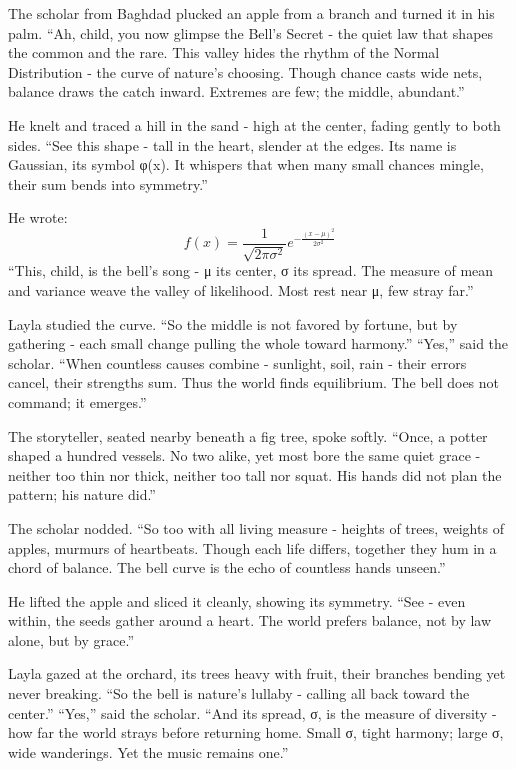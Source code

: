\documentclass[
  letterpaper,
  DIV=11,
  numbers=noendperiod]{scrreprt}
\begin{document}
The scholar from Baghdad plucked an apple from a branch and turned it in
his palm. ``Ah, child, you now glimpse the Bell's Secret - the quiet law
that shapes the common and the rare. This valley hides the rhythm of the
Normal Distribution - the curve of nature's choosing. Though chance
casts wide nets, balance draws the catch inward. Extremes are few; the
middle, abundant.''

He knelt and traced a hill in the sand - high at the center, fading
gently to both sides. ``See this shape - tall in the heart, slender at
the edges. Its name is Gaussian, its symbol φ(x). It whispers that when
many small chances mingle, their sum bends into symmetry.''

He wrote: \[
f(x) = \frac{1}{\sqrt{2\pi\sigma^2}} e^{-\frac{(x-\mu)^2}{2\sigma^2}}
\] ``This, child, is the bell's song - μ its center, σ its spread. The
measure of mean and variance weave the valley of likelihood. Most rest
near μ, few stray far.''

Layla studied the curve. ``So the middle is not favored by fortune, but
by gathering - each small change pulling the whole toward harmony.''
``Yes,'' said the scholar. ``When countless causes combine - sunlight,
soil, rain - their errors cancel, their strengths sum. Thus the world
finds equilibrium. The bell does not command; it emerges.''

The storyteller, seated nearby beneath a fig tree, spoke softly. ``Once,
a potter shaped a hundred vessels. No two alike, yet most bore the same
quiet grace - neither too thin nor thick, neither too tall nor squat.
His hands did not plan the pattern; his nature did.''

The scholar nodded. ``So too with all living measure - heights of trees,
weights of apples, murmurs of heartbeats. Though each life differs,
together they hum in a chord of balance. The bell curve is the echo of
countless hands unseen.''

He lifted the apple and sliced it cleanly, showing its symmetry. ``See -
even within, the seeds gather around a heart. The world prefers balance,
not by law alone, but by grace.''

Layla gazed at the orchard, its trees heavy with fruit, their branches
bending yet never breaking. ``So the bell is nature's lullaby - calling
all back toward the center.'' ``Yes,'' said the scholar. ``And its
spread, σ, is the measure of diversity - how far the world strays before
returning home. Small σ, tight harmony; large σ, wide wanderings. Yet
the music remains one.''
\end{document}
